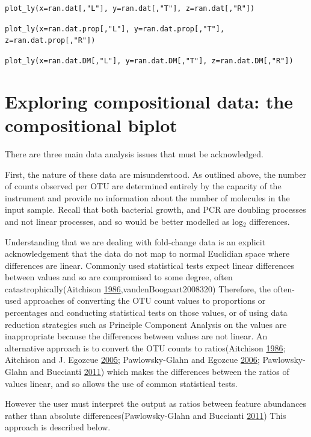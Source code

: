 \documentclass[onecolumn]{book}
\theoremstyle{definition}
\theoremstyle{definition}
\theoremstyle{definition}
\theoremstyle{remark}
\begin{document}
\texttt{plot\_ly(x=ran.dat[,"L"], y=ran.dat[,"T"], z=ran.dat[,"R"])}

\texttt{plot\_ly(x=ran.dat.prop[,"L"], y=ran.dat.prop[,"T"], z=ran.dat.prop[,"R"])}

\texttt{plot\_ly(x=ran.dat.DM[,"L"], y=ran.dat.DM[,"T"], z=ran.dat.DM[,"R"])}

\hypertarget{biplot}{%
\chapter{Exploring compositional data: the compositional
biplot}\label{biplot}}

There are three main data analysis issues that must be acknowledged.

First, the nature of these data are misunderstood. As outlined above,
the number of counts observed per OTU are determined entirely by the
capacity of the instrument and provide no information about the number
of molecules in the input sample. Recall that both bacterial growth, and
PCR are doubling processes and not linear processes, and so would be
better modelled as log\(_2\) differences.

Understanding that we are dealing with fold-change data is an explicit
acknowledgement that the data do not map to normal Euclidian space where
differences are linear. Commonly used statistical tests expect linear
differences between values and so are compromised to some degree, often
catastrophically(Aitchison
\protect\hyperlink{ref-Aitchison:1986}{1986},vandenBoogaart2008320)
Therefore, the often-used approaches of converting the OTU count values
to proportions or percentages and conducting statistical tests on those
values, or of using data reduction strategies such as Principle
Component Analysis on the values are inappropriate because the
differences between values are not linear. An alternative approach is to
convert the OTU counts to ratios(Aitchison
\protect\hyperlink{ref-Aitchison:1986}{1986}; Aitchison and J. Egozcue
\protect\hyperlink{ref-aitchison:2005}{2005}; Pawlowsky-Glahn and
Egozcue \protect\hyperlink{ref-Pawlowsky-Glahn:2006}{2006};
Pawlowsky-Glahn and Buccianti
\protect\hyperlink{ref-pawlowsky2011compositional}{2011}) which makes
the differences between the ratios of values linear, and so allows the
use of common statistical tests.

However the user must interpret the output as ratios between feature
abundances rather than absolute differences(Pawlowsky-Glahn and
Buccianti \protect\hyperlink{ref-pawlowsky2011compositional}{2011}) This
approach is described below.
\end{document}
